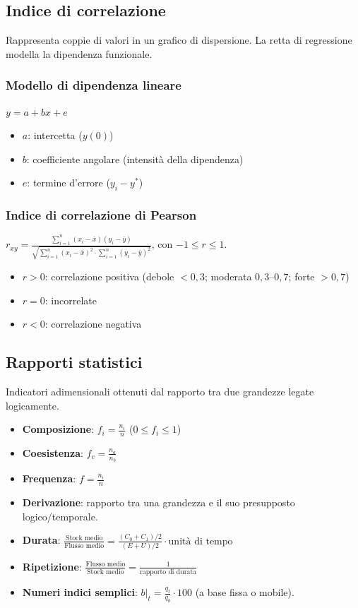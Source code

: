 \documentclass[a4paper,11pt]{article}
\begin{document}
\subsection{Indice di correlazione}
Rappresenta coppie di valori in un grafico di dispersione. La retta di regressione modella la dipendenza funzionale.

\subsubsection{Modello di dipendenza lineare}
$y = a + bx + e$
\begin{itemize}
    \item $a$: intercetta ($y(0)$)
    \item $b$: coefficiente angolare (intensità della dipendenza)
    \item $e$: termine d'errore ($y_i - y^*$)
\end{itemize}

\subsubsection{Indice di correlazione di Pearson}
$r_{xy} = \frac{\sum_{i=1}^{n}(x_i - \bar{x})(y_i - \bar{y})}{\sqrt{\sum_{i=1}^{n}(x_i - \bar{x})^2 \cdot \sum_{i=1}^{n}(y_i - \bar{y})^2}}$, con $-1 \leq r \leq 1$.
\begin{itemize}
    \item $r > 0$: correlazione positiva (debole $<0,3$; moderata $0,3\text{--}0,7$; forte $>0,7$)
    \item $r = 0$: incorrelate
    \item $r < 0$: correlazione negativa
\end{itemize}

\subsection{Rapporti statistici}
Indicatori adimensionali ottenuti dal rapporto tra due grandezze legate logicamente.

\begin{itemize}
    \item \textbf{Composizione}: $f_i = \frac{n_i}{n}$ ($0 \leq f_i \leq 1$)
    \item \textbf{Coesistenza}: $f_c = \frac{n_a}{n_b}$
    \item \textbf{Frequenza}: $f = \frac{n_i}{n}$
    \item \textbf{Derivazione}: rapporto tra una grandezza e il suo presupposto logico/temporale.
    \item \textbf{Durata}: $\frac{\text{Stock medio}}{\text{Flusso medio}} = \frac{(C_0+C_1)/2}{(E+U)/2} \cdot \text{unità di tempo}$
    \item \textbf{Ripetizione}: $\frac{\text{Flusso medio}}{\text{Stock medio}} = \frac{1}{\text{rapporto di durata}}$
    \item \textbf{Numeri indici semplici}: $b|_t = \frac{q_t}{q_b} \cdot 100$ (a base fissa o mobile).
\end{itemize}
\end{document}
